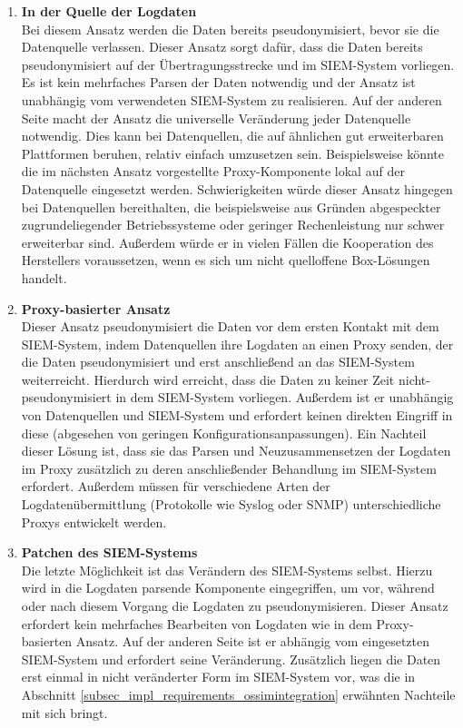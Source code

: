 \begin{enumerate}

\item \textbf{In der Quelle der Logdaten}\\
  Bei diesem Ansatz werden die Daten bereits pseudonymisiert, bevor sie die Datenquelle verlassen. Dieser Ansatz sorgt dafür, dass die Daten bereits pseudonymisiert auf der Übertragungsstrecke und im SIEM-System vorliegen. Es ist kein mehrfaches Parsen der Daten notwendig und der Ansatz ist unabhängig vom verwendeten SIEM-System zu realisieren. Auf der anderen Seite macht der Ansatz die universelle Veränderung jeder Datenquelle notwendig. Dies kann bei Datenquellen, die auf ähnlichen gut erweiterbaren Plattformen beruhen, relativ einfach umzusetzen sein. Beispielsweise könnte die im nächsten Ansatz vorgestellte Proxy-Komponente lokal auf der Datenquelle eingesetzt werden. Schwierigkeiten würde dieser Ansatz hingegen bei Datenquellen bereithalten, die beispielsweise aus Gründen abgespeckter zugrundeliegender Betriebssysteme oder geringer Rechenleistung nur schwer erweiterbar sind. Außerdem würde er in vielen Fällen die Kooperation des Herstellers voraussetzen, wenn es sich um nicht quelloffene \glqq{}Box\grqq{}-Lösungen handelt.

\item \textbf{Proxy-basierter Ansatz}\\
  Dieser Ansatz pseudonymisiert die Daten vor dem ersten Kontakt mit dem SIEM-System, indem Datenquellen ihre Logdaten an einen Proxy senden, der die Daten pseudonymisiert und erst anschließend an das SIEM-System weiterreicht. Hierdurch wird erreicht, dass die Daten zu keiner Zeit nicht-pseudonymisiert in dem SIEM-System vorliegen. Außerdem ist er unabhängig von Datenquellen und SIEM-System und erfordert keinen direkten Eingriff in diese (abgesehen von geringen Konfigurationsanpassungen). Ein Nachteil dieser Lösung ist, dass sie das Parsen und Neuzusammensetzen der Logdaten im Proxy zusätzlich zu deren anschließender Behandlung im SIEM-System erfordert. Außerdem müssen für verschiedene Arten der Logdatenübermittlung (Protokolle wie Syslog oder SNMP) unterschiedliche Proxys entwickelt werden.

\item \textbf{Patchen des SIEM-Systems}\\
  Die letzte Möglichkeit ist das Verändern des SIEM-Systems selbst. Hierzu wird in die Logdaten parsende Komponente eingegriffen, um vor, während oder nach diesem Vorgang die Logdaten zu pseudonymisieren. Dieser Ansatz erfordert kein mehrfaches Bearbeiten von Logdaten wie in dem Proxy-basierten Ansatz. Auf der anderen Seite ist er abhängig vom eingesetzten SIEM-System und erfordert seine Veränderung. Zusätzlich liegen die Daten erst einmal in nicht veränderter Form im SIEM-System vor, was die in Abschnitt \ref{subsec_impl_requirements_ossimintegration} erwähnten Nachteile mit sich bringt.

\end{enumerate}


